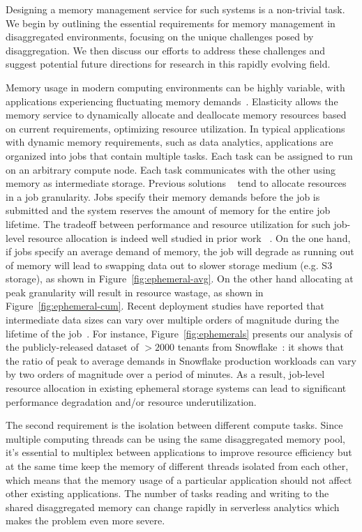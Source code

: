 Designing a memory management service for such systems is a non-trivial task. We begin by outlining the essential requirements for memory management in disaggregated environments, focusing on the unique challenges posed by disaggregation. We then discuss our efforts to address these challenges and suggest potential future directions for research in this rapidly evolving field.

  Memory usage in modern computing environments can be highly variable, with applications experiencing fluctuating memory demands~\cite{jiffy}. Elasticity allows the memory service to dynamically allocate and deallocate memory resources based on current requirements, optimizing resource utilization. In typical applications with dynamic memory requirements, such as data analytics, applications are organized into jobs that contain multiple tasks. Each task can be assigned to run on an arbitrary compute node. Each task communicates with the other using memory as intermediate storage. Previous solutions ~\cite{pocket} tend to allocate resources in a job granularity. Jobs specify their memory demands before the job is submitted and the system reserves the amount of memory for the entire job lifetime. The tradeoff between performance and resource utilization for such job-level resource allocation is indeed well studied in prior work ~\cite{qoop, snowset}. On the one hand, if jobs specify an average demand of memory, the job will degrade as running out of memory will lead to swapping data out to slower storage medium (e.g. S3 storage), as shown in Figure~\ref{fig:ephemeral-avg}. On the other hand allocating at peak granularity will result in resource wastage, as shown in Figure~\ref{fig:ephemeral-cum}. Recent deployment studies have reported that intermediate data sizes can vary over multiple orders of magnitude during the lifetime of the job~\cite{snowset}. For instance, Figure~\ref{fig:ephemerals} presents our analysis of the publicly-released dataset of $>2000$ tenants from Snowflake~\cite{snowset}: it shows that the ratio of peak to average demands in Snowflake production workloads can vary by two orders of magnitude over a period of minutes. As a result, job-level resource allocation in existing ephemeral storage systems can lead to significant performance degradation and/or resource underutilization. 

 The second requirement is the isolation between different compute tasks. Since multiple computing threads can be using the same disaggregated memory pool, it's essential to multiplex between applications to improve resource efficiency but at the same time keep the memory of different threads isolated from each other, which means that the memory usage of a particular application should not affect other existing applications. The number of tasks reading and writing to the shared disaggregated memory can change rapidly in serverless analytics which makes the problem even more severe.

